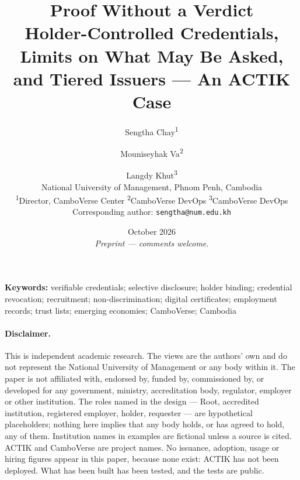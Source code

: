 \documentclass[10pt,a4paper,twocolumn]{article}
\title{\textbf{Proof Without a Verdict}\\[0.4em]
  \large Holder-Controlled Credentials, Limits on What May Be Asked,\\
  and Tiered Issuers --- An ACTIK Case}
\author{Sengtha Chay\textsuperscript{1} \and Mouniseyhak Va\textsuperscript{2} \and Langdy Khut\textsuperscript{3}\\[0.6em]
  \small National University of Management, Phnom Penh, Cambodia\\
  \small \textsuperscript{1}Director, CamboVerse Center \quad \textsuperscript{2}CamboVerse DevOps \quad \textsuperscript{3}CamboVerse DevOps\\
  \small Corresponding author: \texttt{sengtha@num.edu.kh}}
\date{October 2026\\[0.5em]\normalsize\emph{Preprint --- comments welcome.}}
\begin{document}
\maketitle

\noindent\textbf{Keywords:} verifiable credentials; selective disclosure; holder binding;
credential revocation; recruitment; non-discrimination; digital certificates;
employment records; trust lists; emerging economies; CamboVerse; Cambodia

\paragraph{Disclaimer.}
This is independent academic research. The views are the authors' own and do
not represent the National University of Management or any body within it. The
paper is not affiliated with, endorsed by, funded by, commissioned by, or
developed for any government, ministry, accreditation body, regulator, employer
or other institution. The roles named in the design --- Root, accredited
institution, registered employer, holder, requester --- are hypothetical
placeholders; nothing here implies that any body holds, or has agreed to hold,
any of them. Institution names in examples are fictional unless a source is
cited. ACTIK and CamboVerse are project names. No issuance, adoption, usage or
hiring figures appear in this paper, because none exist: ACTIK has not been
deployed. What has been built has been tested, and the tests are public.
\end{document}
